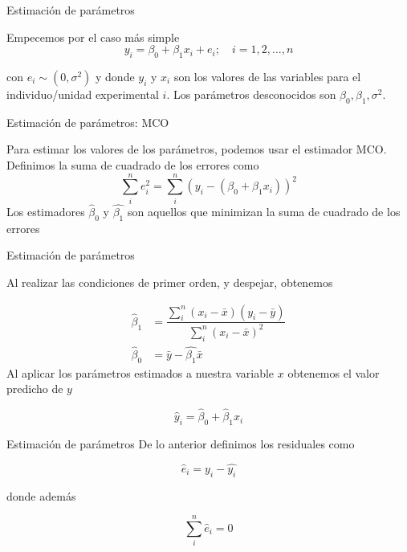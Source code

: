 \documentclass{beamer}
\begin{document}
\begin{frame}{Estimación de parámetros}

Empecemos por el caso más simple
\begin{equation*}
    y_i=\beta_0+\beta_1x_i+e_i; \quad i=1,2,...,n
\end{equation*}

con $e_i\sim (0,\sigma^2)$ y donde $y_i$ y $x_i$ son los valores de las variables para el individuo/unidad experimental $i$. Los parámetros desconocidos son $\beta_0, \beta_1, \sigma^2$.
    
\end{frame}

\begin{frame}{Estimación de parámetros: MCO}

Para estimar los valores de los parámetros, podemos usar el estimador MCO. Definimos la suma de cuadrado de los errores como
    \begin{equation*}
        \sum_i^ne_i^2=\sum_i^n(y_i-(\beta_0+\beta_1x_i))^2
    \end{equation*}
    Los estimadores $\hat{\beta}_0$ y $\hat{\beta_1}$ son aquellos que minimizan la suma de cuadrado de los errores
\end{frame}

\begin{frame}{Estimación de parámetros}

Al realizar las condiciones de primer orden, y despejar, obtenemos

\begin{align*}
    \hat{\beta}_1&=\dfrac{\sum_i^n(x_i-\bar{x})(y_i-\bar{y})}{\sum_i^n(x_i-\bar{x})^2}\\
    \hat{\beta}_0&=\bar{y}-\hat{\beta_1}\bar{x}
\end{align*}
  Al aplicar los parámetros estimados a nuestra variable $x$ obtenemos el valor predicho de $y$

  \begin{equation*}
      \hat{y}_i=\hat{\beta}_0+\hat{\beta}_1x_i
  \end{equation*}
    
\end{frame}

\begin{frame}{Estimación de parámetros}
    De lo anterior definimos los residuales como

    \begin{equation*}
        \hat{e}_i=y_i-\hat{y_i}
    \end{equation*}

    donde además

    \begin{equation*}
        \sum_i^n\hat{e}_i=0
    \end{equation*}
\end{frame}
\end{document}
